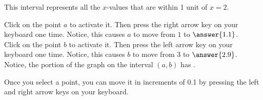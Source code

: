 \documentclass{ximera}
\begin{document}
\begin{exercise}
\begin{question}
\begin{question}
\begin{question}
\begin{feedback}
        		This interval represents all the $x$-values that are within 1 unit of $x=2$.
        	\end{feedback}
        	\begin{question}
        		Click on the point $a$ to activate it.  Then press the right arrow key on your keyboard one time.  Notice, this causes $a$ to move from $1$ to $\answer{1.1}$.\\
        		Click on the point $b$ to activate it.  Then press the left arrow key on your keyboard one time.  Notice, this causes $b$ to move from $3$ to $\answer{2.9}$.\\
        		Notice, the portion of the graph on the interval $(a,b)$ has .
        		\begin{feedback}
        			Once you select a point, you can move it in increments of 0.1 by pressing the left and right arrow keys on your keyboard.
        		\end{feedback}
        	\end{question}
        
        \end{question}
      \end{question}
   \end{question}
   \begin{question}
   	 
   \end{question}
 \end{exercise}
\end{document}
